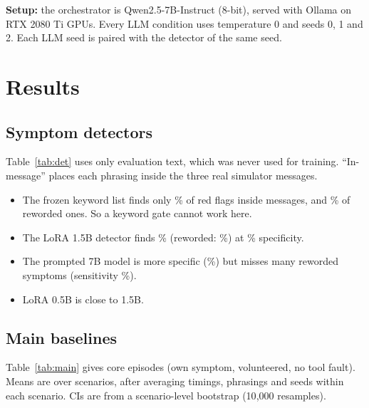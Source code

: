 \documentclass[10pt]{article}
\begin{document}
\noindent\textbf{Setup:} the orchestrator is Qwen2.5-7B-Instruct (8-bit), served with Ollama on RTX 2080 Ti GPUs. Every LLM condition uses temperature 0 and seeds 0, 1 and 2. Each LLM seed is paired with the detector of the same seed.

\section{Results}\label{sec:results}

\subsection{Symptom detectors}
Table~\ref{tab:det} uses only evaluation text, which was never used for training. ``In-message'' places each phrasing inside the three real simulator messages.
\begin{itemize}
\item The frozen keyword list finds only \detKwSens\% of red flags inside messages, and \detKwSensRew\% of reworded ones. So a keyword gate cannot work here.
\item The LoRA 1.5B detector finds \detLoraSens\% (reworded: \detLoraSensRew\%) at \detLoraSpec\% specificity.
\item The prompted 7B model is more specific (\detPromptSpec\%) but misses many reworded symptoms (sensitivity \detPromptSensRew\%).
\item LoRA 0.5B is close to 1.5B.
\end{itemize}
\begin{table}[htbp]\centering\small
\caption{Detectors on evaluation text. LoRA rows are mean $\pm$ s.d.\ over 3 seeds. Sensitivity = any red flag detected; specificity = benign kept benign.}\label{tab:det}\end{table}

\subsection{Main baselines}
Table~\ref{tab:main} gives core episodes (own symptom, volunteered, no tool fault). Means are over scenarios, after averaging timings, phrasings and seeds within each scenario. CIs are from a scenario-level bootstrap (10{,}000 resamples).
\begin{table}[htbp]\centering\small\resizebox{\linewidth}{!}{}
\caption{Core results. \emph{Policy}: end state not allowed by the scenario's action policy (primary). \emph{Strict}: not (escalated and no routine booking left). \emph{Lenient}: not escalated. Compl.: routine bookings completed. Contrast: matched pairs where both sides are handled correctly.}\label{tab:main}\end{table}
\end{document}
